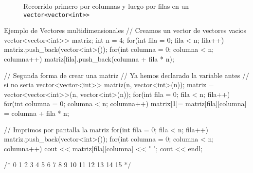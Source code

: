 \documentclass{article}
\begin{document}
    \begin{figure}[h]
        \centering
        \caption{Recorrido primero por columnas y luego por filas en un \texttt{vector<vector<int>>}}
    \end{figure}

    \begin{codelisting}{Ejemplo de Vectores multidimensionales}
// Creamos un vector de vectores vacios
vector<vector<int>> matriz;
int n = 4;
for(int fila = 0; fila < n; fila++) {
    matriz.push_back(vector<int>());
    for(int columna = 0; columna < n; columna++) {
        matriz[fila].push_back(columna + fila * n);
    }
}

// Segunda forma de crear una matriz
// Ya hemos declarado la variable antes
// si no seria vector<vector<int>> matriz(n, vector<int>(n));
matriz = vector<vector<int>>(n, vector<int>(n)); 
for(int fila = 0; fila < n; fila++) {
    for(int columna = 0; columna < n; columna++) {matrix[1]=
        matriz[fila][columna] = columna + fila * n;
    }
}

// Imprimos por pantalla la matriz
for(int fila = 0; fila < n; fila++) {
    matriz.push_back(vector<int>());
    for(int columna = 0; columna < n; columna++) {
        cout << matriz[fila][columna] << " ";
    }
    cout << endl;
}

/*
    0 1 2 3 
    4 5 6 7 
    8 9 10 11 
    12 13 14 15
*/
    \end{codelisting}
\end{document}
